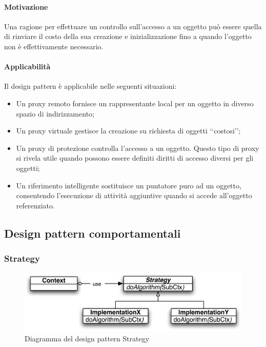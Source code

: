 	\paragraph{Motivazione\\}
	Una ragione per effettuare un controllo sull'accesso a un oggetto può essere quella di rinviare il costo della sua creazione e inizializzazione fino a quando l'oggetto non è effettivamente necessario.	
	\paragraph{Applicabilità\\}
	Il design pattern\glossary{} è applicabile nelle seguenti situazioni:
	\begin{itemize}
		\item Un proxy remoto fornisce un rappresentante local per un oggetto in diverso spazio di indirizzamento;
		\item Un proxy virtuale gestisce la creazione su richiesta di oggetti \lq\lq{}costosi\rq\rq{};
		\item Un proxy di protezione controlla l'accesso a un oggetto. Questo tipo di proxy si rivela utile quando possono essere definiti diritti di accesso diversi per gli oggetti;
		\item Un riferimento intelligente sostituisce un puntatore puro ad un oggetto, consentendo l'esecuzione di attività aggiuntive quando si accede all'oggetto referenziato.
	\end{itemize}
\pagebreak

\subsection{Design pattern comportamentali}
\subsubsection{Strategy}
\label{DPStrategy}
\begin{figure}[!h]
	\centering
	\includegraphics[width=0.7\linewidth]{./Content/Immagini/Strategy.png}
	\caption{Diagramma del design pattern Strategy}
	\label{figStra}
\end{figure}

